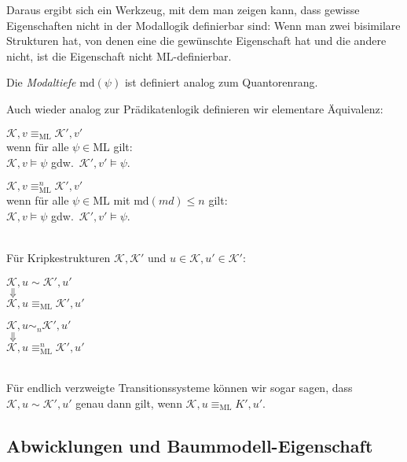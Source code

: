 \documentclass{panikzettel}
\newcommand{\K}{\mathcal{K}}
\newcommand{\ML}{\mathrm{ML}}
\begin{document}
Daraus ergibt sich ein Werkzeug, mit dem man zeigen kann, dass gewisse Eigenschaften nicht in der Modallogik definierbar sind: Wenn man zwei bisimilare Strukturen hat, von denen eine die gewünschte Eigenschaft hat und die andere nicht, ist die Eigenschaft nicht $\ML$-definierbar.

Die \emph{Modaltiefe} $\mathrm{md}(\psi)$ ist definiert analog zum Quantorenrang.

Auch wieder analog zur Prädikatenlogik definieren wir elementare Äquivalenz:

\begin{minipage}{0.4\textwidth}
\centering
$\K, v \equiv_\ML \K', v'$ \\
{\small wenn für alle $\psi \in \ML$ gilt: \\}
$\K, v \models \psi$ gdw.\ $\K', v' \models \psi$.
\end{minipage}\hspace{0.1\textwidth}
\begin{minipage}{0.4\textwidth}
\centering
$\K, v \equiv_\ML^n \K', v'$ \\
{\small wenn für alle $\psi \in \ML$ mit $\mathrm{md}(md) \leq n$ gilt: \\}
$\K, v \models \psi$ gdw.\ $\K', v' \models \psi$.
\end{minipage}
\ \\

Für Kripkestrukturen $\K, \K'$ und $u \in \K, u' \in \K'$:

\begin{minipage}{0.4\textwidth}
\centering
$\K, u \sim \K', u'$ \\
$\Downarrow$ \\
$\K, u \equiv_\ML \K', u'$
\end{minipage}\hspace{0.1\textwidth}
\begin{minipage}{0.4\textwidth}
\centering
$\K, u \sim_n \K', u'$ \\
$\Downarrow$ \\
$\K, u \equiv_\ML^n \K', u'$
\end{minipage}
\ \\

Für endlich verzweigte Transitionssysteme können wir sogar sagen, dass $\K, u \sim \K', u'$ genau dann gilt, wenn $\K, u \equiv_\ML K', u'$.

\subsection{Abwicklungen und Baummodell-Eigenschaft}
\end{document}
